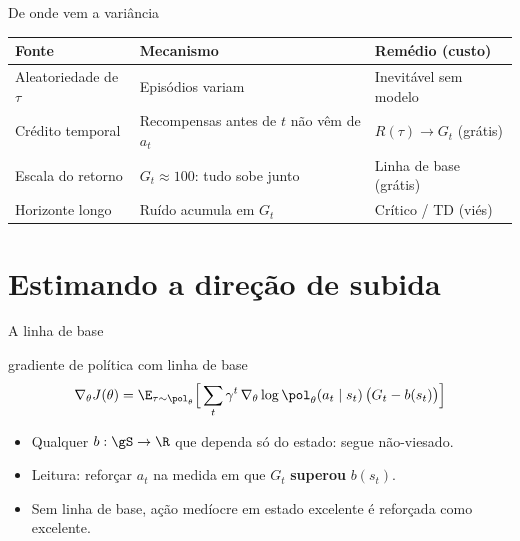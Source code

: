 \documentclass[aspectratio=169, 11pt]{beamer}
\newcommand{\azul}[1]{{\color{rlAzulClaro}#1}}
\begin{document}
\begin{frame}{De onde vem a variância}
  \small
  \begin{tabular}{@{}p{}p{}p{}@{}}
    \toprule
    \textbf{Fonte} & \textbf{Mecanismo} & \textbf{Remédio (custo)} \\
    \midrule
    Aleatoriedade de $\tau$ & Episódios variam & Inevitável sem modelo \\
    Crédito temporal & Recompensas antes de $t$ não vêm de $a_t$ & \azul{$R(\tau)\to G_t$ (grátis)} \\
    Escala do retorno & $G_t\approx 100$: tudo sobe junto & \azul{Linha de base (grátis)} \\
    Horizonte longo & Ruído acumula em $G_t$ & {\color{rlLaranja}Crítico / TD (viés)} \\
    \bottomrule
  \end{tabular}
\end{frame}

\section{Estimando a direção de subida}

\begin{frame}{A linha de base}
  \begin{defbox}{gradiente de política com linha de base}
    \[
      \nabla_\theta J(\theta) = \E_{\tau\sim\pol_\theta}\Big[\sum_{t}\gamma^t\,
        \nabla_\theta\log\pol_\theta(a_t\mid s_t)\,\big(G_t - b(s_t)\big)\Big]
    \]
  \end{defbox}
  \begin{itemize}\small
    \item Qualquer $b:\gS\to\R$ que dependa \alert{só do estado}: segue não-viesado.
    \item Leitura: reforçar $a_t$ na medida em que $G_t$ \textbf{superou} $b(s_t)$.
    \item Sem linha de base, ação medíocre em estado excelente é reforçada como excelente.
  \end{itemize}
\end{frame}
\end{document}
